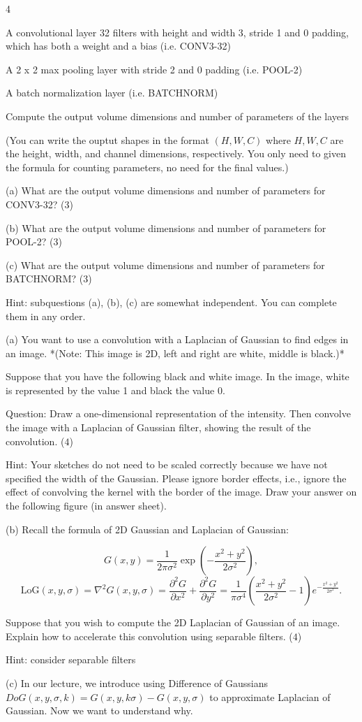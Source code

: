 \documentclass[8pt,a4paper,landscape]{extarticle}
\newcommand{\Hthree}[1]{\par\noindent{\tiny\bfseries\color{black}\hspace{0.45em}#1}\par}
\newcommand{\Body}[1]{{\tiny #1\par}}
\begin{document}
\begin{multicols*}{4}
\Body{\textbullet{} A convolutional layer 32 filters with height and width 3, stride 1 and 0 padding, which has both a weight and a bias (i.e. CONV3-32)}
\Body{\textbullet{} A 2 x 2 max pooling layer with stride 2 and 0 padding (i.e. POOL-2)}
\Body{\textbullet{} A batch normalization layer (i.e. BATCHNORM)}
\Body{Compute the output volume dimensions and number of parameters of the layers}
\Body{(You can write the ouptut shapes in the format $(H,W,C)$ where $H,W,C$ are the height, width, and channel dimensions, respectively. You only need to given the formula for counting parameters, no need for the final values.)}
\Body{(a) What are the output volume dimensions and number of parameters for CONV3-32? ($3$)}
\Body{(b) What are the output volume dimensions and number of parameters for POOL-2? ($3$)}
\Body{(c) What are the output volume dimensions and number of parameters for BATCHNORM? ($3$)}
\Hthree{1.4.2 Laplacian of Gaussians ($16$ pts)}
\Body{Hint: subquestions (a), (b), (c) are somewhat independent. You can complete them in any order.}
\Body{(a) You want to use a convolution with a Laplacian of Gaussian to find edges in an image. *(Note: This image is 2D, left and right are white, middle is black.)*}
\Body{Suppose that you have the following black and white image. In the image, white is represented by the value 1 and black the value 0.}
\Body{Question: Draw a one-dimensional representation of the intensity. Then convolve the image with a Laplacian of Gaussian filter, showing the result of the convolution. ($4$)}
\Body{Hint: Your sketches do not need to be scaled correctly because we have not specified the width of the Gaussian. Please ignore border effects, i.e., ignore the effect of convolving the kernel with the border of the image. Draw your answer on the following figure (in answer sheet).}
\Body{(b) Recall the formula of 2D Gaussian and Laplacian of Gaussian:}
\[
G(x,y)=\frac{1}{2\pi\sigma^2}\exp\left(-\frac{x^2+y^2}{2\sigma^2}\right),
\]
\[
\text{LoG}(x, y, \sigma) = \nabla^2 G(x, y, \sigma) = \frac{\partial^2 G}{\partial x^2} + \frac{\partial^2 G}{\partial y^2}
= \frac{1}{\pi\sigma^4} \left( \frac{x^2 + y^2}{2\sigma^2} - 1 \right) e^{-\frac{x^2 + y^2}{2\sigma^2}}.
\]
\Body{Suppose that you wish to compute the 2D Laplacian of Gaussian of an image. Explain how to accelerate this convolution using separable filters. ($4$)}
\Body{Hint: consider separable filters}
\Body{(c) In our lecture, we introduce using Difference of Gaussians $DoG(x,y,\sigma,k)=G(x,y,k\sigma)-G(x,y,\sigma)$ to approximate Laplacian of Gaussian. Now we want to understand why.}

\end{multicols*}
\end{document}

